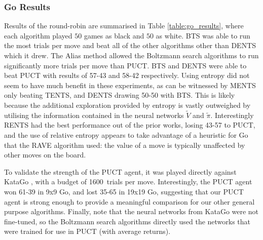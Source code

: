         \subsubsection{Go Results}

            Results of the round-robin are summarised in Table \ref{table:go_results}, where each algorithm played $50$ games as black and $50$ as white. BTS was able to run the most trials per move and beat all of the other algorithms other than DENTS which it drew. The Alias method allowed the Boltzmann search algorithms to run significantly more trials per move than PUCT. BTS and DENTS were able to beat PUCT with results of 57-43 and 58-42 respectively. Using entropy did not seem to have much benefit in these experiments, as can be witnessed by MENTS only beating TENTS, and DENTS drawing 50-50 with BTS. This is likely because the additional exploration provided by entropy is vastly outweighed by utilising the information contained in the neural networks $\tilde{V}$ and $\tilde{\pi}$. Interestingly RENTS had the best performance out of the prior works, losing 43-57 to PUCT, and the use of relative entropy appears to take advantage of a heuristic for Go that the RAVE \cite{rave} algorithm used: the value of a move is typically unaffected by other moves on the board.
            
            To validate the strength of the \thtspp\ewe PUCT agent, it was played directly against KataGo \cite{katago}, with a budget of 1600~trials per move. Interestingly, the \thtspp\ewe PUCT agent won 61-39 in 9x9 Go, and lost 35-65 in 19x19 Go, suggesting that our PUCT agent is strong enough to provide a meaningful comparison for our other general purpose algorithms. Finally, note that the neural networks from KataGo were not fine-tuned, so the Boltzmann search algorithms directly used the networks that were trained for use in PUCT (with average returns).
            
          	

